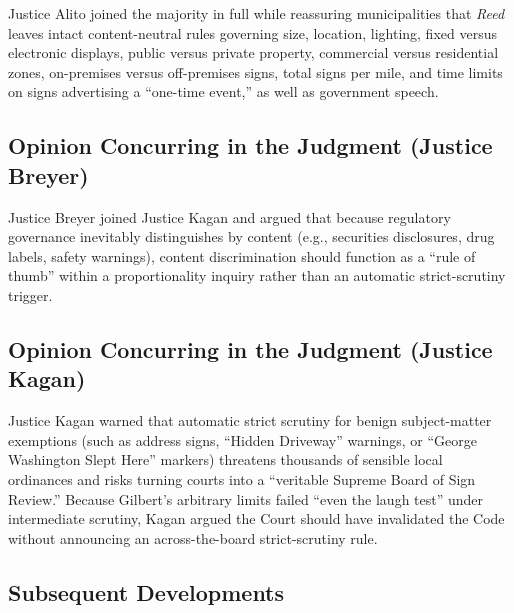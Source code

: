 \documentclass[12pt]{article}
\begin{document}
Justice Alito joined the majority in full while reassuring municipalities that \textit{Reed} leaves intact content-neutral rules governing size, location, lighting, fixed versus electronic displays, public versus private property, commercial versus residential zones, on-premises versus off-premises signs, total signs per mile, and time limits on signs advertising a ``one-time event,'' as well as government speech.

\subsection{Opinion Concurring in the Judgment (Justice Breyer)}

Justice Breyer joined Justice Kagan and argued that because regulatory governance inevitably distinguishes by content (e.g., securities disclosures, drug labels, safety warnings), content discrimination should function as a ``rule of thumb'' within a proportionality inquiry rather than an automatic strict-scrutiny trigger.

\subsection{Opinion Concurring in the Judgment (Justice Kagan)}

Justice Kagan warned that automatic strict scrutiny for benign subject-matter exemptions (such as address signs, ``Hidden Driveway'' warnings, or ``George Washington Slept Here'' markers) threatens thousands of sensible local ordinances and risks turning courts into a ``veritable Supreme Board of Sign Review.'' Because Gilbert's arbitrary limits failed ``even the laugh test'' under intermediate scrutiny, Kagan argued the Court should have invalidated the Code without announcing an across-the-board strict-scrutiny rule.

\subsection{Subsequent Developments}
\end{document}

